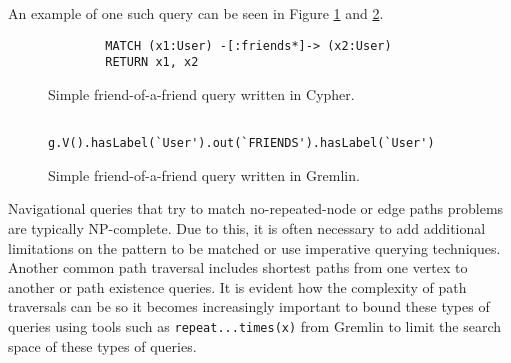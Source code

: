 An example of one such query can be seen in Figure \ref{lst:cypher-nav-1} and \ref{lst:gremlin-nav-1}.

\begin{figure}
    \centering
    \begin{verbatim}
        MATCH (x1:User) -[:friends*]-> (x2:User)
        RETURN x1, x2
    \end{verbatim}
    \caption{Simple friend-of-a-friend query written in Cypher.}
    \label{lst:cypher-nav-1}
\end{figure}

\begin{figure}
    \centering
    \begin{verbatim}
        g.V().hasLabel(`User').out(`FRIENDS').hasLabel(`User')
    \end{verbatim}
    \caption{Simple friend-of-a-friend query written in Gremlin.}
    \label{lst:gremlin-nav-1}
\end{figure}

Navigational queries that try to match no-repeated-node or edge paths problems are typically NP-complete. Due to this, it is often necessary to add additional limitations on the pattern to be matched or use imperative querying techniques. Another common path traversal includes shortest paths from one vertex to another or path existence queries. It is evident how the complexity of path traversals can be so it becomes increasingly important to bound these types of queries using tools such as \texttt{repeat...times(x)} from Gremlin to limit the search space of these types of queries.
